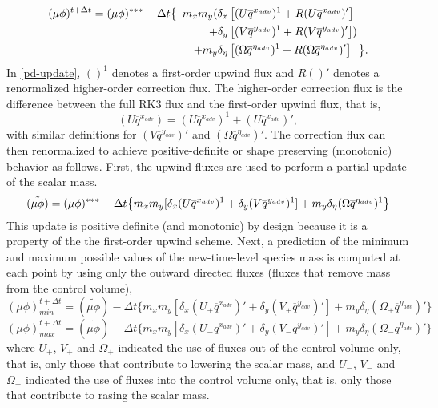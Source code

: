\begin{align}
(\mu\phi)^{t+\Delta t} = (\mu\phi)^{***} - {\Delta t}\bigl\{ \,\,\,
m_x m_y ( \delta_x &\left[ (U \overline{q}^{x_{adv}})^1 
+ R(U \overline{q}^{x_{adv}})' \right] 
\notag
\\
+\delta_y &\left[(V\overline{q}^{y_{adv}})^1 
+ R(V\overline{q}^{y_{adv}})'\right] )
\notag
\\
+ m_y \delta_\eta &\left[
(\Omega \overline{q}^{\eta_{adv}})^1 + R(\Omega \overline{q}^{\eta_{adv}})' \right]
\,\,\,\, \bigr\}.
\label{pd-update}
\end{align}
%
In \eqref{pd-update}, $()^1$ denotes a first-order upwind flux and $R()'$
denotes a renormalized higher-order correction flux.  The higher-order
correction flux is the difference between the full RK3 flux and the
first-order upwind flux, that is,
%
\begin{equation}
(U \overline{q}^{x_{adv}}) = (U \overline{q}^{x_{adv}})^1 + (U
\overline{q}^{x_{adv}})',
\label{correction-def}
\end{equation}
%
with similar definitions for $(V \overline{q}^{y_{adv}})'$ 
and $(\Omega \overline{q}^{\eta_{adv}})'$.  The correction flux can then
renormalized to achieve positive-definite or shape preserving (monotonic) behavior as follows.  
First, the upwind fluxes are used to perform a
partial update of the scalar mass.
%
\begin{equation}
(\tilde{\mu\phi}) = (\mu\phi)^{***} 
- {\Delta t} \bigl\{
m_x m_y [\delta_x (U \overline{q}^{x_{adv}})^1 
+ \delta_y (V\overline{q}^{y_{adv}})^1] 
+ m_y \delta_\eta
(\Omega \overline{q}^{\eta_{adv}})^1\bigr\}
\notag
\end{equation}
%
This update is positive definite (and monotonic) by design because it is a property of the
the first-order upwind scheme.  Next, a prediction of the minimum and maximum
possible values of the new-time-level species mass is computed at each
point by using only the outward directed fluxes (fluxes that remove mass
from the control volume),
%
\begin{equation}
(\mu\phi)_{min}^{t+\Delta t} = (\tilde{\mu\phi}) 
-{\Delta t} \bigl\{
m_x m_y [\delta_x (U_+ \overline{q}^{x_{adv}})' 
+ \delta_y (V_+\overline{q}^{y_{adv}})'] 
+ m_y \delta_\eta
(\Omega_+ \overline{q}^{\eta_{adv}})'\bigr\}
\label{min-prediction}
\end{equation}
%
\begin{equation}
(\mu\phi)_{max}^{t+\Delta t} = (\tilde{\mu\phi}) 
-{\Delta t} \bigl\{
m_x m_y [\delta_x (U_- \overline{q}^{x_{adv}})' 
+ \delta_y (V_-\overline{q}^{y_{adv}})'] 
+ m_y \delta_\eta
(\Omega_- \overline{q}^{\eta_{adv}})'\bigr\}
\label{max-prediction}
\end{equation}
%
where $U_+$, $V_+$ and $\Omega_+$ indicated the use of fluxes 
out of the control volume only, that is, only those that contribute to
lowering the scalar mass,
and $U_-$, $V_-$ and $\Omega_-$ indicated the use of fluxes 
into the control volume only, that is, only those that contribute to
rasing the scalar mass.  

